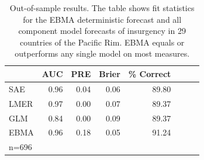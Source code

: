 \documentclass[pdftex,12pt,fullpage,oneside]{amsart}
\begin{document}
\begin{table}
\small
\begin{center}
\vspace{-20pt}
  \caption{\footnotesize 
  Out-of-sample results. The table shows fit
    statistics for the EBMA deterministic forecast and all component
    model forecasts of insurgency in 29 countries of the Pacific
    Rim. EBMA equals or outperforms any single model on most
    measures.}\label{OutSam1}
\begin{tabular}{l rrrrrrr}
  \toprule
 & AUC & PRE & Brier & \% Correct \\ 
  \midrule
  SAE &  0.96 & 0.04 & 0.06 & 89.80 \\ 
  LMER & 0.97 & 0.00 & 0.07 & 89.37\\ 
  GLM & 0.84 & 0.00 & 0.09 & 89.37\\ 
  EBMA & 0.96 & 0.18 & 0.05 & 91.24 \\ 
   \bottomrule
n=696 \\
\end{tabular}
\end{center}
\end{table}
\end{document}
